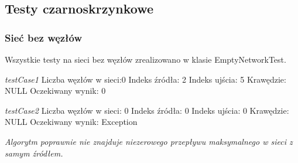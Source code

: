\subsection{Testy czarno\dywiz skrzynkowe}



\subsubsection{Sieć bez węzłów}
Wszystkie testy na sieci bez węzłów zrealizowano w klasie EmptyNetworkTest.

\emph{testCase1}
Liczba węzłów w sieci:0
Indeks źródła: 2
Indeks ujścia: 5
Krawędzie: NULL
Oczekiwany wynik: 0

\emph{testCase2}
Liczba węzłów w sieci: 0
Indeks źródła: 0
Indeks ujścia: 0
Krawędzie: NULL
Oczekiwany wynik: Exception

\emph{Algorytm poprawnie nie znajduje niezerowego przepływu maksymalnego w sieci
z samym źródłem.}

